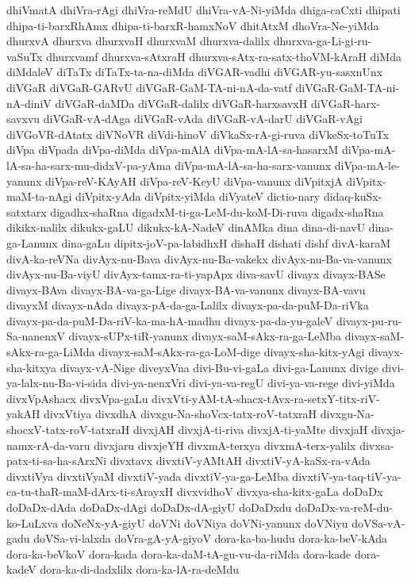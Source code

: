 {dhiVmatA
dhiVra-rAgi
dhiVra-reMdU
dhiVra-vA-Ni-yiMda
dhiga-caCxti
dhipati
dhipa-ti-barxRhAmx
dhipa-ti-barxR-hamxNoV
dhitAtxM
dhoVra-Ne-yiMda
dhurxvA
dhurxva
dhurxvaH
dhurxvaM
dhurxva-dalilx
dhurxva-ga-Li-gi-ru-vaSuTx
dhurxvamf
dhurxva-sAtxraH
dhurxva-sAtx-ra-satx-thoVM-kAraH
diMda
diMdaleV
diTaTx
diTaTx-ta-na-diMda
diVGAR-vadhi
diVGAR-yu-sasxnUnx
diVGaR
diVGaR-GARvU
diVGaR-GaM-TA-ni-nA-da-vatf
diVGaR-GaM-TA-ni-nA-diniV
diVGaR-daMDa
diVGaR-dalilx
diVGaR-harxsavxH
diVGaR-harx-savxvu
diVGaR-vA-dAga
diVGaR-vAda
diVGaR-vA-darU
diVGaR-vAgi
diVGoVR-dAtatx
diVNoVR
diVdi-hinoV
diVkaSx-rA-gi-ruva
diVkeSx-toTuTx
diVpa
diVpada
diVpa-diMda
diVpa-mAlA
diVpa-mA-lA-sa-hasarxM
diVpa-mA-lA-sa-ha-sarx-mu-didxV-pa-yAma
diVpa-mA-lA-sa-ha-sarx-vanunx
diVpa-mA-le-yanunx
diVpa-reV-KAyAH
diVpa-reV-KeyU
diVpa-vanunx
diVpitxjA
diVpitx-maM-ta-nAgi
diVpitx-yAda
diVpitx-yiMda
diVyateV
dictio-nary
didaq-kuSx-satxtarx
digadhx-shaRna
digadxM-ti-ga-LeM-du-koM-Di-ruva
digadx-shaRna
dikikx-nalilx
dikukx-gaLU
dikukx-kA-NadeV
dinAMka
dina
dina-di-navU
dina-ga-Lanunx
dina-gaLu
dipitx-joV-pa-labidhxH
dishaH
dishati
dishf
divA-karaM
divA-ka-reVNa
divAyx-nu-Bava
divAyx-nu-Ba-vakekx
divAyx-nu-Ba-va-vanunx
divAyx-nu-Ba-viyU
divAyx-tamx-ra-ti-yapApx
diva-savU
divayx
divayx-BASe
divayx-BAva
divayx-BA-va-ga-Lige
divayx-BA-va-vanunx
divayx-BA-vavu
divayxM
divayx-nAda
divayx-pA-da-ga-Lalilx
divayx-pa-da-puM-Da-riVka
divayx-pa-da-puM-Da-riV-ka-ma-hA-madhu
divayx-pa-da-yu-galeV
divayx-pu-ru-Sa-nanenxV
divayx-sUPx-tiR-yanunx
divayx-saM-sAkx-ra-ga-LeMba
divayx-saM-sAkx-ra-ga-LiMda
divayx-saM-sAkx-ra-ga-LoM-dige
divayx-sha-kitx-yAgi
divayx-sha-kitxya
divayx-vA-Nige
diveyxVna
divi-Bu-vi-gaLa
divi-ga-Lanunx
divige
divi-ya-lalx-nu-Ba-vi-sida
divi-ya-nenxVri
divi-ya-va-regU
divi-ya-va-rege
divi-yiMda
divxVpAshacx
divxVpa-gaLu
divxVti-yAM-tA-shacx-tAvx-ra-setxY-titx-riV-yakAH
divxVtiya
divxdhA
divxgu-Na-shoVcx-tatx-roV-tatxraH
divxgu-Na-shocxV-tatx-roV-tatxraH
divxjAH
divxjA-ti-riva
divxjA-ti-yaMte
divxjaH
divxja-namx-rA-da-varu
divxjaru
divxjeYH
divxmA-terxya
divxmA-terx-yalilx
divxsa-patx-ti-sa-ha-sArxNi
divxtavx
divxtiV-yAMtAH
divxtiV-yA-kaSx-ra-vAda
divxtiVya
divxtiVyaM
divxtiV-yada
divxtiV-ya-ga-LeMba
divxtiV-ya-taq-tiV-ya-ca-tu-thaR-maM-dArx-ti-sArayxH
divxvidhoV
divxya-sha-kitx-gaLa
doDaDx
doDaDx-dAda
doDaDx-dAgi
doDaDx-dA-giyU
doDaDxdu
doDaDx-va-reM-du-ko-LuLxva
doNeNx-yA-giyU
doVNi
doVNiya
doVNi-yanunx
doVNiyu
doVSa-vA-gadu
doVSa-vi-lalxda
doVra-gA-yA-giyoV
dora-ka-ba-hudu
dora-ka-beV-kAda
dora-ka-beVkoV
dora-kada
dora-ka-daM-tA-gu-vu-da-riMda
dora-kade
dora-kadeV
dora-ka-di-dadxlilx
dora-ka-lA-ra-deMdu
}
